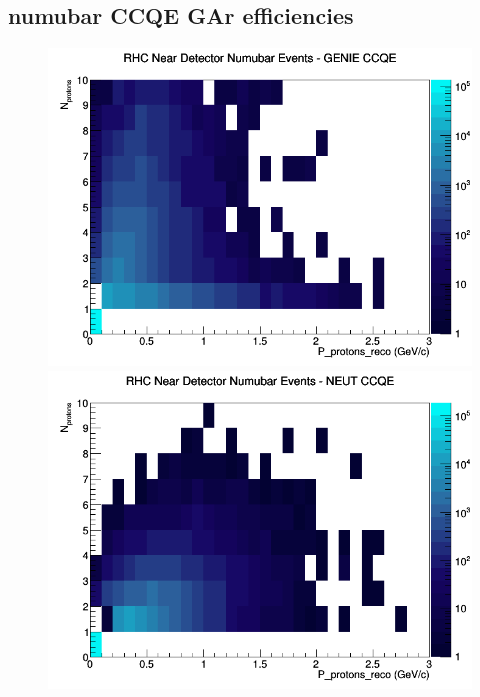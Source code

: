 \subsection{numubar CCQE GAr efficiencies}
\begin{figure}[h]
\includegraphics[width=\linewidth]{eff_N_P/GAr/protons/CCQE_RHC_ND_numubar_N_P_GENIE.png}
\endminipage
{}
\includegraphics[width=\linewidth]{eff_N_P/GAr/protons/CCQE_RHC_ND_numubar_N_P_NEUT.png}
\endminipage
{}

\end{figure}

